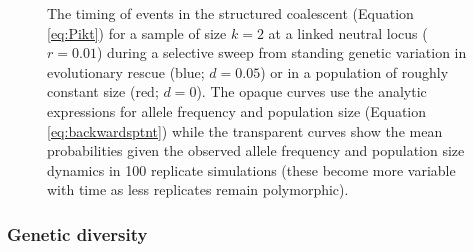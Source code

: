 \documentclass[]{article}
\begin{document}
\begin{figure}[htb]
\caption{
The timing of events in the structured coalescent (Equation \ref{eq:Pikt}) for a sample of size $k=2$ at a linked neutral locus ($r=0.01$) during a selective sweep from standing genetic variation in evolutionary rescue (blue; $d=0.05$) or in a population of roughly constant size (red; $d=0$).
The opaque curves use the analytic expressions for allele frequency and population size (Equation \ref{eq:backwardsptnt}) while the transparent curves show the mean probabilities given the observed allele frequency and population size dynamics in 100 replicate simulations (these become more variable with time as less replicates remain polymorphic).
}%
\label{fig:rescueSGV_timing}
\end{figure}

\subsubsection*{Genetic diversity}
\end{document}
